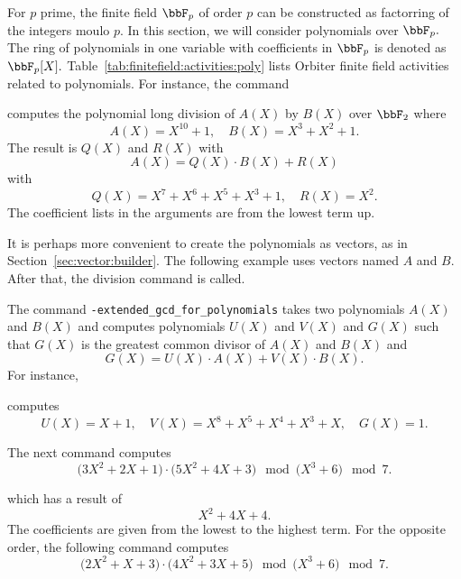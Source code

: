 For $p$ prime, the finite field $\bbF_p$ of 
order $p$ can be constructed as factorring of the integers moulo $p$. 
In this section, we will consider polynomials over $\bbF_p.$
The ring of polynomials in one variable 
with coefficients in $\bbF_p$ is denoted as $\bbF_p[X].$ 
Table~\ref{tab:finitefield:activities:poly} 
lists Orbiter finite field activities related to polynomials.
For instance, the command 


computes the polynomial long division of $A(X)$ by $B(X)$ over $\bbF_2$ where 
$$
A(X) = X^{10} + 1, \quad B(X) = X^3+X^2+1.
$$
The result is $Q(X)$ and $R(X)$
with 
$$
A(X) = Q(X) \cdot B(X) + R(X)
$$
with 
$$
Q(X) = X^{7} + X^{6} + X^{5} + X^{3} + 1, \quad R(X) = X^{2}.
$$
The coefficient lists in the arguments are from the lowest term up.

\bigskip


It is perhaps more convenient to create the polynomials
as vectors, as in Section~\ref{sec:vector:builder}. 
The following example uses vectors named $A$ and $B.$
After that, the division command is called. 




\bigskip





The command 
\verb'-extended_gcd_for_polynomials' 
takes two polynomials $A(X)$ and $B(X)$ and 
computes polynomials $U(X)$ and $V(X)$ and $G(X)$ such that $G(X)$ 
is the greatest common divisor of $A(X)$ and $B(X)$ and 
$$
G(X) = U(X) \cdot A(X) + V(X) \cdot B(X).
$$
For instance, 


computes 
$$
U(X)=X + 1, \quad 
V(X)=X^{8} + X^{5} + X^{4} + X^{3} + X, \quad 
G(X)=1.
$$


\bigskip

The next command computes 
$$
\big( 3X^2 + 2X + 1 \big) \cdot \big( 5X^2+4X+3\big) \mod \big( X^3 +6\big) \mod 7.
$$


which has a result of 
$$
X^2+4X+4.
$$
The coefficients are given from the lowest to the highest term. 
For the opposite order, the following command computes 
$$
\big(2X^{2} + X + 3\big) \cdot  \big(4X^{2} + 3X + 5\big) \mod \big( X^3 +6\big) \mod 7.
$$

